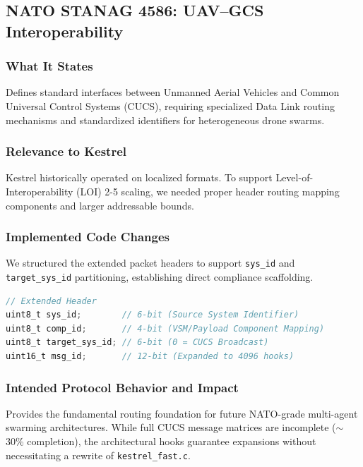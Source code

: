 \documentclass[11pt,a4paper]{article}
\begin{document}
\vspace{0.5cm}

\subsection{NATO STANAG 4586: UAV--GCS Interoperability}

\subsubsection{What It States}
Defines standard interfaces between Unmanned Aerial Vehicles and Common Universal Control Systems (CUCS), requiring specialized Data Link routing mechanisms and standardized identifiers for heterogeneous drone swarms.

\subsubsection{Relevance to Kestrel}
Kestrel historically operated on localized formats. To support Level-of-Interoperability (LOI) 2-5 scaling, we needed proper header routing mapping components and larger addressable bounds.

\subsubsection{Implemented Code Changes}
We structured the extended packet headers to support \texttt{sys\_id} and \texttt{target\_sys\_id} partitioning, establishing direct compliance scaffolding.

\begin{lstlisting}[language=C, caption={STANAG Interoperability Extensible Header Hooks (\texttt{kestrel.h})}]
// Extended Header
uint8_t sys_id;        // 6-bit (Source System Identifier)
uint8_t comp_id;       // 4-bit (VSM/Payload Component Mapping)
uint8_t target_sys_id; // 6-bit (0 = CUCS Broadcast)
uint16_t msg_id;       // 12-bit (Expanded to 4096 hooks)
\end{lstlisting}

\subsubsection{Intended Protocol Behavior and Impact}
Provides the fundamental routing foundation for future NATO-grade multi-agent swarming architectures. While full CUCS message matrices are incomplete ($\sim$30\% completion), the architectural hooks guarantee expansions without necessitating a rewrite of \texttt{kestrel\_fast.c}.
\end{document}
